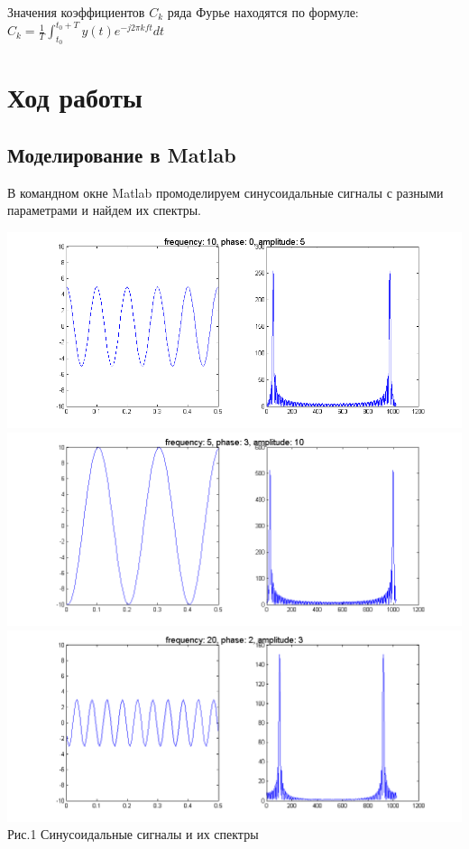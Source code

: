 \documentclass[a4paper]{article}
\begin{document}
Значения коэффициентов $C_k$ ряда Фурье находятся по формуле:\\

$C_k = \frac{1}{T}\int_{t_0}^{t_0+T}y(t)e^{-j2{\pi}kft}dt$\\

\section{Ход работы}
\subsection{Моделирование в Matlab}

В командном окне Matlab промоделируем синусоидальные сигналы с разными параметрами и найдем их спектры. 



\begin{center}
	\includegraphics[scale = 0.5]{sin1.png}
	\includegraphics[scale = 0.5]{sin2.png}
	\includegraphics[scale = 0.5]{sin3.png} \\ Рис.1 Синусоидальные сигналы и их спектры 
\end{center} 
\end{document}
